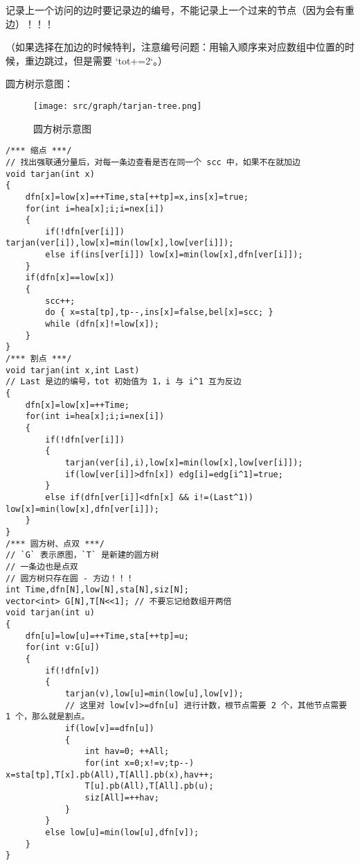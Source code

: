 记录上一个访问的边时要记录边的编号，不能记录上一个过来的节点（因为会有重边）！！！

（如果选择在加边的时候特判，注意编号问题：用输入顺序来对应数组中位置的时候，重边跳过，但是需要 `tot+=2`。）

圆方树示意图：

\begin{figure}[H]
    \centering
    \texttt{[image: src/graph/tarjan-tree.png]}
    \caption{圆方树示意图}
\end{figure}

\begin{verbatim}
/*** 缩点 ***/
// 找出强联通分量后，对每一条边查看是否在同一个 scc 中，如果不在就加边
void tarjan(int x)
{
	dfn[x]=low[x]=++Time,sta[++tp]=x,ins[x]=true;
	for(int i=hea[x];i;i=nex[i])
	{
		if(!dfn[ver[i]]) tarjan(ver[i]),low[x]=min(low[x],low[ver[i]]);
		else if(ins[ver[i]]) low[x]=min(low[x],dfn[ver[i]]);
	}
	if(dfn[x]==low[x])
	{
        scc++;
		do { x=sta[tp],tp--,ins[x]=false,bel[x]=scc; }
        while (dfn[x]!=low[x]);
	}
}
/*** 割点 ***/
void tarjan(int x,int Last)
// Last 是边的编号，tot 初始值为 1，i 与 i^1 互为反边
{
    dfn[x]=low[x]=++Time;
    for(int i=hea[x];i;i=nex[i])
    {
        if(!dfn[ver[i]])
        {
            tarjan(ver[i],i),low[x]=min(low[x],low[ver[i]]);
            if(low[ver[i]]>dfn[x]) edg[i]=edg[i^1]=true;
        }
        else if(dfn[ver[i]]<dfn[x] && i!=(Last^1)) low[x]=min(low[x],dfn[ver[i]]);
    }
}
/*** 圆方树、点双 ***/
// `G` 表示原图，`T` 是新建的圆方树
// 一条边也是点双
// 圆方树只存在圆 - 方边！！！
int Time,dfn[N],low[N],sta[N],siz[N];
vector<int> G[N],T[N<<1]; // 不要忘记给数组开两倍
void tarjan(int u)
{
    dfn[u]=low[u]=++Time,sta[++tp]=u;
    for(int v:G[u])
    {
        if(!dfn[v])
        {
            tarjan(v),low[u]=min(low[u],low[v]);
            // 这里对 low[v]>=dfn[u] 进行计数，根节点需要 2 个，其他节点需要 1 个，那么就是割点。
            if(low[v]==dfn[u])
            {
                int hav=0; ++All;
                for(int x=0;x!=v;tp--) x=sta[tp],T[x].pb(All),T[All].pb(x),hav++;
                T[u].pb(All),T[All].pb(u);
                siz[All]=++hav;
            }
        }
        else low[u]=min(low[u],dfn[v]);
    }
}
\end{verbatim}